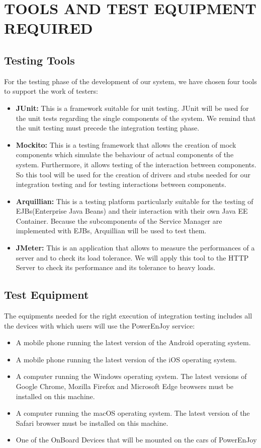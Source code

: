 \section{TOOLS AND TEST EQUIPMENT REQUIRED}
\subsection{Testing Tools}
For the testing phase of the development of our system, we have chosen four tools to support the work of testers:
\begin{itemize}
\item \textbf{JUnit:}
This is a framework suitable for unit testing. JUnit will be used for the unit tests regarding the single components of the system. We remind that the unit testing must precede the integration testing phase.
\item \textbf{Mockito:}
This is a testing framework that allows the creation of mock components which simulate the behaviour of actual components of the system. Furthermore, it allows testing of the interaction between components. So this tool will be used for the creation of drivers and stubs needed for our integration testing and for testing interactions between components.
\item \textbf{Arquillian:}
This is a testing platform particularly suitable for the testing of EJBs(Enterprise Java Beans) and their interaction with their own Java EE Container. Because the subcomponents of the Service Manager are implemented with EJBs, Arquillian will be used to test them.
\item \textbf{JMeter:}
This is an application that allows to measure the performances of a server and to check its load tolerance. We will apply this tool to the HTTP Server to check its performance and its tolerance to heavy loads.
\end{itemize}

\subsection{Test Equipment}
The equipments needed for the right execution of integration testing includes all the devices with which users will use the PowerEnJoy service:
\begin{itemize}
\item A mobile phone running the latest version of the Android operating system.
\item A mobile phone running the latest version of the iOS operating system.
\item A computer running the Windows operating system. The latest versions of Google Chrome, Mozilla Firefox and Microsoft Edge browsers must be installed on this machine.
\item A computer running the macOS operating system. The latest version of the Safari browser must be installed on this machine.
\item One of the OnBoard Devices that will be mounted on the cars of PowerEnJoy
\end{itemize}

